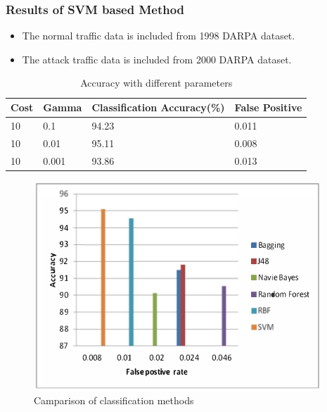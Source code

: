 \documentclass[10pt]{beamer}
\begin{document}
\begin{frame}
\frametitle{Results of SVM based Method}

\begin{itemize}
\footnotesize
\item
The normal traffic data is included from 1998 DARPA dataset.
\item

The attack traffic data is included from 2000 DARPA dataset.
\end{itemize}

\begin{table}
\scriptsize
\begin{center}
\begin{tabular}{ | m{2cm} | m{2cm}| m{2cm} | m{2cm} |} 
\hline
\textbf{Cost} & \textbf{Gamma} & \textbf{Classification Accuracy(\%)} & \textbf{False Positive} \\
\hline
10 &
0.1 &
94.23 &
0.011 \\
\hline
10 &
0.01 &
95.11 &
0.008 \\
\hline
10 &
0.001 &
93.86 &
0.013 \\
\hline
\end{tabular}
\end{center}
\caption{\footnotesize Accuracy with different parameters}
\end{table}

\begin{figure}[h]
\includegraphics[scale=0.35]{svm.png}
\caption{Camparison of classification methods	}

\end{figure}
\end{frame}
\end{document}
